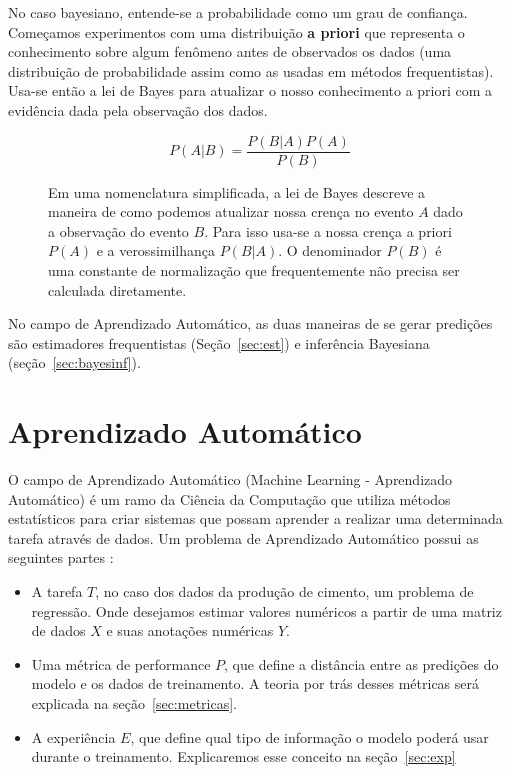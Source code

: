 No caso bayesiano, entende-se a probabilidade como um grau de confiança. Começamos
experimentos com uma distribuição \textbf{a priori} que representa o
conhecimento sobre algum fenômeno antes de observados os dados (uma distribuição
de probabilidade assim como as usadas em métodos frequentistas). Usa-se então a
lei de Bayes para atualizar o nosso conhecimento a priori com a evidência dada
pela observação dos dados.

 \begin{figure} 
\[
  P(A|B)=\frac{P(B|A)P(A)}{P(B)}
\]
\caption{Em uma nomenclatura simplificada, a lei de Bayes descreve a maneira de
  como podemos atualizar nossa crença no evento $A$ dado a observação do evento
  $B$. Para isso usa-se a nossa crença a priori $P(A)$ e a verossimilhança
  $P(B|A)$. O denominador $P(B)$ é uma constante de normalização que
  frequentemente não precisa ser calculada diretamente.}
  \end{figure}




No campo de Aprendizado Automático, as duas maneiras de se gerar predições são estimadores
frequentistas (Seção~\ref{sec:est}) e inferência Bayesiana (seção~\ref{sec:bayesinf}).



\section{Aprendizado Automático}
\label{sec:aprenauto}
O campo de Aprendizado Automático (Machine Learning - Aprendizado Automático) é um ramo da Ciência
da Computação que utiliza métodos estatísticos para criar sistemas que possam
aprender a realizar uma determinada tarefa através de dados. Um problema de Aprendizado Automático possui
as seguintes partes \citep{dlbook}: \\

\begin{itemize}

  
\item A tarefa $T$, no caso dos dados da produção de cimento, um problema de regressão.
  Onde desejamos estimar valores numéricos a partir de uma matriz de dados $X$ e
  suas anotações numéricas $Y$. 
  
\item Uma métrica de performance $P$, que define a distância entre as predições
  do modelo e os dados de treinamento. A teoria por trás desses métricas será explicada na seção~\ref{sec:metricas}.

\item A experiência $E$, que define qual tipo de informação o modelo poderá usar
  durante o treinamento. Explicaremos esse conceito na seção~\ref{sec:exp} 
  
\end{itemize}

